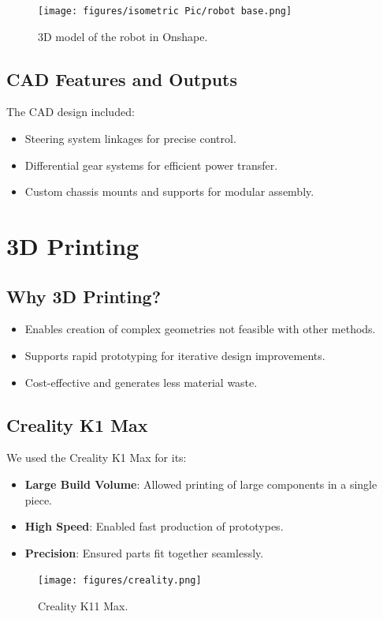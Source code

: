 \documentclass[12pt,a4paper]{article}
\begin{document}
\begin{figure}[ht]
    \centering
    \texttt{[image: figures/isometric Pic/robot base.png]}
    \caption{3D model of the robot in Onshape.}
    \label{fig:onshape_model}
\end{figure}

\subsection{CAD Features and Outputs}
The CAD design included:
\begin{itemize}
    \item Steering system linkages for precise control.
    \item Differential gear systems for efficient power transfer.
    \item Custom chassis mounts and supports for modular assembly.
\end{itemize}

\section{3D Printing}
\subsection{Why 3D Printing?}
\begin{itemize}
    \item Enables creation of complex geometries not feasible with other methods.
    \item Supports rapid prototyping for iterative design improvements.
    \item Cost-effective and generates less material waste.
\end{itemize}

\subsection{Creality K1 Max}
We used the Creality K1 Max for its:
\begin{itemize}
    \item \textbf{Large Build Volume}: Allowed printing of large components in a single piece.
    \item \textbf{High Speed}: Enabled fast production of prototypes.
    \item \textbf{Precision}: Ensured parts fit together seamlessly.
\end{itemize}

\begin{figure}[ht]
    \centering
    \texttt{[image: figures/creality.png]}
    \caption{Creality K11 Max.}
    \label{fig:creality}
\end{figure}
\end{document}
